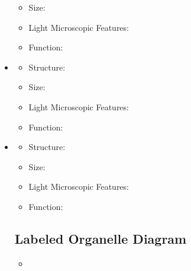 \begin{itemize}
\begin{itemize}
    \item Size:
    \item Light Microscopic Features:
    \item Function:
  \end{itemize}
  \item {}
  \begin{itemize}
    \item Structure:
    \item Size:
    \item Light Microscopic Features:
    \item Function:
  \end{itemize}
  \item {}
  \begin{itemize}
    \item Structure:
    \item Size:
    \item Light Microscopic Features:
    \item Function:
  \end{itemize}

  \subsection{Labeled Organelle Diagram}
  \begin{itemize}
    \item 
  \end{itemize}
\end{itemize}

